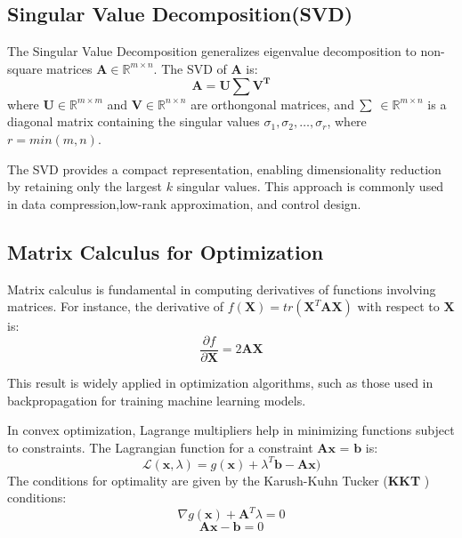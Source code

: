 \documentclass[twocolumn]{IEEEtran}
\begin{document}
\begin{samepage}
\subsection{Singular Value Decomposition(SVD)}
 The Singular Value Decomposition generalizes eigenvalue
 decomposition to non-square matrices $\textbf{A} \in \mathbb{R}^{m \times n}$. The SVD
 of $\textbf{A}$ is:
\begin{equation}
  \mathbf{A = U \textstyle{\sum}V^T } 
\end{equation}
 where $\textbf{U} \in \mathbb{R}^{m \times m}$ and $\textbf{V} \in \mathbb{R}^{n \times n}$ are orthongonal matrices, and $\small\sum$ $ \in \mathbb{R}^{m \times n}$ is a diagonal matrix containing the singular values $\sigma_{1}, \sigma_{2},\ldots,\sigma_{r}$, where $r=min(m,n)$.
 \par  The SVD provides a compact representation, enabling dimensionality reduction by retaining only the largest $k$ singular values. This approach is commonly used in data compression,low-rank approximation, and control design.
\subsection{Matrix Calculus for Optimization}
  Matrix calculus is fundamental in computing derivatives of
 functions involving matrices. For instance, the derivative of
 $f(\textbf{X}) = tr(\textbf{X}^T\textbf{AX})$ with respect to $\textbf{X}$ is:
 \begin{equation}
     \frac{\partial f}{\partial \textbf{X}} = 2\textbf{AX}
 \end{equation}
 \par This result is widely applied in optimization algorithms, such as those used in backpropagation for training machine learning models.
 \par In convex optimization, Lagrange multipliers help in minimizing functions subject to constraints. The Lagrangian function for a constraint $\textbf{Ax = b}$ is:
\begin{equation}
    \mathcal{L}(\textbf{x},\lambda) = g(\textbf{x}) + \lambda^T \textbf{b} - \textbf{Ax})
\end{equation}
The conditions for optimality are given by the Karush-Kuhn Tucker (\textbf{KKT} ) conditions:
\begin{equation}
    \nabla g(\textbf{x}) + \textbf{A}^T \lambda = 0
\end{equation}
\begin{equation}\textbf{Ax} - \textbf{b}=0\end{equation}

\end{samepage}
\end{document}
